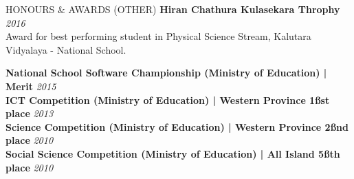 \documentclass{cv}
\begin{document}
\begin{rSection}{HONOURS \& AWARDS (OTHER)}
    {\bf Hiran Chathura Kulasekara Throphy}                                                         \hfill {\em 2016}
    \\Award for best performing student in Physical Science Stream, Kalutara Vidyalaya - National School. \par

    {\bf National School Software Championship (Ministry of Education) | Merit}     \hfill {\em 2015} \\
    {\bf ICT Competition (Ministry of Education) | Western Province 1\ss{st} place}      \hfill {\em 2013}\\
    {\bf Science Competition (Ministry of Education) | Western Province 2\ss{nd} place}   \hfill {\em 2010}\\
    {\bf Social Science Competition (Ministry of Education) | All Island 5\ss{th} place}  \hfill {\em 2010}
\end{rSection}
\newpage

\end{document}
